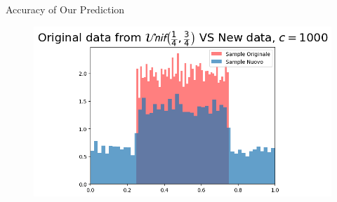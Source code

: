 \documentclass{beamer}
\begin{document}
\begin{frame}{Accuracy of Our Prediction}
\begin{figure}
\begin{minipage}{0.32\textwidth}
            \includegraphics[width=\textwidth]{Predc1000.png}
        \end{minipage}
    \end{figure}
    \caption{Predictive density estimated for an \(Unif(1/4,3/4)\)}


\end{frame}
\end{document}
